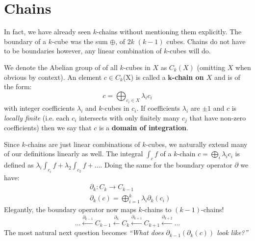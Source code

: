 %
%
\section{Chains}

In fact, we have already seen $k$-chains without mentioning them explicitly.
The boundary of a $k$-cube was the sum $\oplus$, of $2k$ $(k-1)$ cubes.
Chains do not have to be boundaries however, any linear combination of $k$-cubes will do.


\begin{definition}
We denote the Abelian group of of all $k$-cubes in $X$ as $C_k(X)$ (omitting $X$ when obvious by context).
An element $c \in C_k$(X) is called a \textbf{$\boldsymbol{k}$-chain on $X$} and is of the form:
\begin{equation}
	c = \bigoplus_{c_i \in X} \lambda_i c_i
\end{equation}
with integer coefficients $\lambda_i$ and  $k$-cubes in $c_i$.
If coefficients $\lambda_i$ are $\pm 1$ and $c$ is \emph{locally finite} (i.e. each $c_i$ intersects with only finitely many $c_j$ that have non-zero coefficients) then we say that $c$ is a \textbf{domain of integration}.
\end{definition}
	
	
Since $k$-chains are just linear combinations of $k$-cubes, we naturally extend many of our definitions linearly as well.
The integral $\int_c f$ of a $k$-chain $c=\bigoplus_i \lambda_i c_i$ is defined as $\lambda_i \int_{c_i} f  + \lambda_2 \int_{c_2} f + \ldots$.
Doing the same for the boundary operator $\partial$ we have:
\begin{align*}
	&\partial_k: C_k \to C_{k-1} \\
	&\partial_k(c) = \bigoplus_{i=1}^k \lambda_i \partial_k(c_i)
\end{align*}
Elegantly, the boundary operator now maps $k$-chains to $(k-1)$-chains!
\begin{equation}
	\ldots \xleftarrow{\partial_{k-1}} C_{k-1} \xleftarrow{\partial_{k}} C_k \xleftarrow{\partial_{k+1}} C_{k+1} \xleftarrow{\partial_{k+2}} ...
\end{equation}
The most natural next question becomes \emph{``What does $\partial_{k-1}( \partial_k ( c ))$ look like?''}




